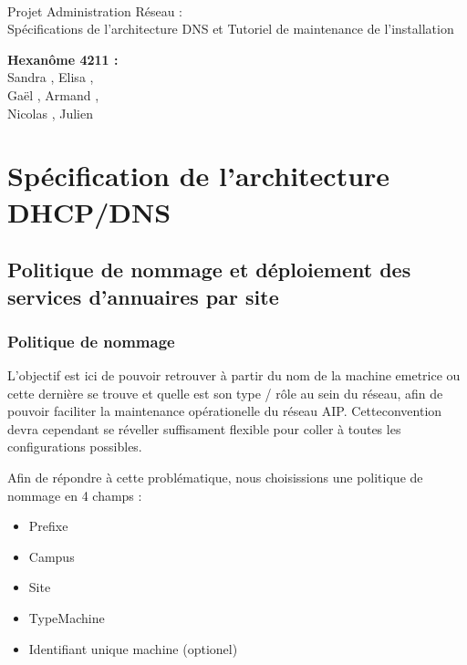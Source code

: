 \documentclass[a4paper]{article}
\begin{document}
\begin{titlepage}
	~ 
	\vfill
	\begin{center}
		\begin{Huge}
			Projet Administration Réseau : \\ Spécifications de l'architecture DNS et Tutoriel de maintenance de l'installation\\
		\end{Huge}
	\vfill
		\textbf{Hexanôme 4211 :} 
			\\Sandra {}, Elisa , 
			\\Gaël , Armand , 
			\\Nicolas {}, Julien \\
	\vfill
	\end{center}
	\vfill
\end{titlepage}

\newpage
\tableofcontents
\newpage

\section{Spécification de l'architecture DHCP/DNS}

\subsection{Politique de nommage et déploiement des services d'annuaires par site}

\subsubsection{Politique de nommage}

L'objectif est ici de pouvoir retrouver à partir du nom de la machine emetrice ou cette dernière se trouve et quelle est son type / rôle au sein du réseau, afin de pouvoir faciliter la maintenance opérationelle du réseau AIP. Cetteconvention devra cependant se réveller suffisament flexible pour coller à toutes les configurations possibles.

Afin de répondre à cette problématique, nous choisissions une politique de nommage en 4 champs : 

\begin{itemize}
\item Prefixe
\item Campus
\item Site
\item TypeMachine
\item Identifiant unique machine (optionel)
\end{itemize}
\end{document}

